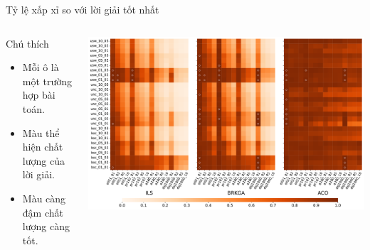 \documentclass[aspectratio=169]{beamer}
\begin{document}
\begin{frame}{Tỷ lệ xấp xỉ so với lời giải tốt nhất}
\begin{columns}
    \begin{column}{0.25\textwidth}
        \centering
        \begin{block}{\footnotesize Chú thích}
            \footnotesize 
            \begin{itemize}
                \justifying
                \vspace{0.1cm}
                \item Mỗi ô là một trường hợp bài toán.
                \vspace{0.1cm}
                \item Màu thể hiện chất lượng của lời giải.
                \vspace{0.1cm}
                \item Màu càng đậm chất lượng càng tốt.
                \vspace{0.1cm}
            \end{itemize}
        \end{block}
    \end{column}
    \begin{column}{0.75\textwidth}
        \centering
        \includegraphics[width=0.95\linewidth]{img/profit_ratio_horizontal_1.pdf}
    \end{column}
\end{columns}
\end{frame}
\end{document}
